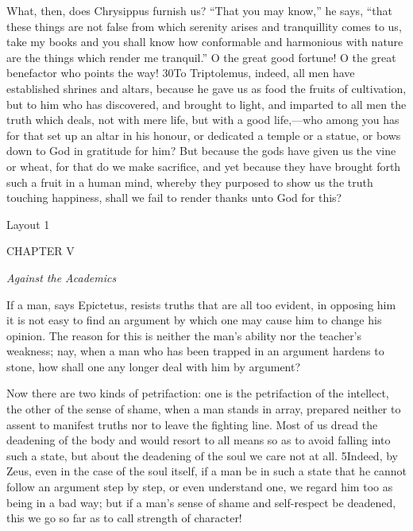 What, then, does Chrysippus furnish us? ``That you may know,'' he says, ``that these things are not false from which serenity arises and tranquillity comes to us, take my books and you shall know how conformable and harmonious with nature are the things which render me tranquil.'' O the great good fortune! O the great benefactor who points the way! 30To Triptolemus, indeed, all men have established shrines and altars, because he gave us as food the fruits of cultivation, but to him who has discovered, and brought to light, and imparted to all men the truth which deals, not with mere life, but with a good life,—who among you has for that set up an altar in his honour, or dedicated a temple or a statue, or bows down to God in gratitude for him? But because the gods have given us the vine or wheat, for that do we make sacrifice, and yet because they have brought forth such a fruit in a human mind, whereby they purposed to show us the truth touching happiness, shall we fail to render thanks unto God for this?



Layout 1

CHAPTER V

\emph{Against the Academics}

If a man, says Epictetus, resists truths that are all too evident, in opposing him it is not easy to find an argument by which one may cause him to change his opinion. The reason for this is neither the man's ability nor the teacher's weakness; nay, when a man who has been trapped in an argument hardens to stone, how shall one any longer deal with him by argument?

Now there are two kinds of petrifaction: one is the petrifaction of the intellect, the other of the sense of shame, when a man stands in array, prepared neither to assent to manifest truths nor to leave the fighting line. Most of us dread the deadening of the body and would resort to all means so as to avoid falling into such a state, but about the deadening of the soul we care not at all. 5Indeed, by Zeus, even in the case of the soul itself, if a man be in such a state that he cannot follow an argument step by step, or even understand one, we regard him too as being in a bad way; but if a man's sense of shame and self-respect be deadened, this we go so far as to call strength of character!

